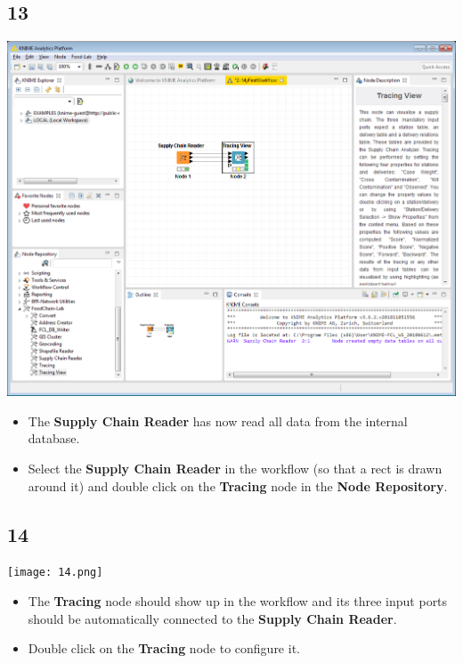 \documentclass{beamer}
\begin{document}
\subsection{13}
\begin{frame}
	\begin{center}
  		\includegraphics[height=0.6\textheight]{13.png}
	\end{center}
	\begin{itemize}
		\item The \textbf{Supply Chain Reader} has now read all data from the internal database.
		\item Select the \textbf{Supply Chain Reader} in the workflow (so that a rect is drawn around it) and double click on the \textbf{Tracing} node in the \textbf{Node Repository}.
	\end{itemize}
\end{frame}

\subsection{14}
\begin{frame}
	\begin{center}
  		\texttt{[image: 14.png]}
	\end{center}
	\begin{itemize}
		\item The \textbf{Tracing} node should show up in the workflow and its three input ports should be automatically connected to the \textbf{Supply Chain Reader}.
		\item Double click on the \textbf{Tracing} node to configure it.
	\end{itemize}
\end{frame}
\end{document}
